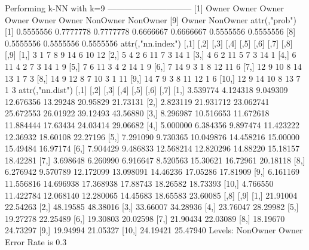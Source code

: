 \documentclass{article}
\begin{document}
\begin{Schunk}
\begin{Soutput}
Performing k-NN with k=9
 ------------------------------
 [1] Owner    Owner    Owner    Owner    Owner    Owner    NonOwner NonOwner
 [9] Owner    NonOwner
attr(,"prob")
 [1] 0.5555556 0.7777778 0.7777778 0.6666667 0.6666667 0.5555556 0.5555556
 [8] 0.5555556 0.5555556 0.5555556
attr(,"nn.index")
      [,1] [,2] [,3] [,4] [,5] [,6] [,7] [,8] [,9]
 [1,]    3    1    7    8    9   14    6   10   12
 [2,]    5    4    2    6   11    7    3   14    1
 [3,]    4    6    2   11    5    7    3   14    1
 [4,]    6   11    4    2    7    3   14    1    9
 [5,]    7    6   11    3    4    2   14    1    9
 [6,]    7   14    9    3    1    8   12   11    6
 [7,]   12    9   10    8   14   13    1    7    3
 [8,]   14    9   12    8    7   10    3    1   11
 [9,]   14    7    9    3    8   11   12    1    6
[10,]   12    9   14   10    8   13    7    1    3
attr(,"nn.dist")
          [,1]      [,2]      [,3]      [,4]     [,5]     [,6]     [,7]
 [1,] 3.539774  4.124318  9.049309 12.676356 13.29248 20.95829 21.73131
 [2,] 2.823119 21.931712 23.062741 25.672553 26.01922 39.12493 43.56880
 [3,] 8.296987 10.516653 11.672618 11.884444 17.63434 24.03414 29.06682
 [4,] 5.000000  6.384356  9.897474 11.423222 12.36932 18.60108 22.27196
 [5,] 7.291090  9.730365 10.049876 14.458216 15.00000 15.49484 16.97174
 [6,] 7.904429  9.486833 12.568214 12.820296 14.88220 15.18157 18.42281
 [7,] 3.698648  6.260990  6.916647  8.520563 15.30621 16.72961 20.18118
 [8,] 6.276942  9.570789 12.172099 13.098091 14.46236 17.05286 17.81909
 [9,] 6.161169 11.556816 14.696938 17.368938 17.88743 18.26582 18.73393
[10,] 4.766550 11.422784 12.068140 12.280065 14.45683 18.65583 23.60085
          [,8]     [,9]
 [1,] 21.91004 22.54263
 [2,] 48.19585 48.38016
 [3,] 33.66007 34.28936
 [4,] 23.76047 28.29982
 [5,] 19.27278 22.25489
 [6,] 19.30803 20.02598
 [7,] 21.90434 22.03089
 [8,] 18.19670 24.73297
 [9,] 19.94994 21.05327
[10,] 24.19421 25.47940
Levels: NonOwner Owner
Error Rate is  0.3


\end{Soutput}
\end{Schunk}
\end{document}
